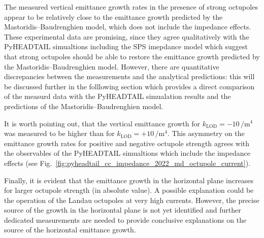 The measured vertical emittance growth rates in the presence of strong octupoles appear to be relatively close to the emittance growth predicted by the Mastoridis--Baudrenghien model, which does not include the impedance effects. These experimental data are promising, since they agree qualitatively with the PyHEADTAIL simualtions including the SPS imepdance model which suggest that strong octupoles should be able to restore the emittance growth predicted by the Mastoridis--Baudrenghien model. However, there are quantitative discrepancies between the measurements and the analytical predictions: this will be discussed further in the folllowing section which provides a direct comparison of the measurd data with the PyHEADTAIL simualation results and the predictions of the Mastoridis--Baudrenghien model.

It is worth pointing out, that the vertical emittance growth for $k_\mathrm{LOD}=-10$\,$\mathrm{/m^4}$ was measured to be higher than for $k_\mathrm{LOD}=+10$\,$\mathrm{/m^4}$. This asymmetry on the emittance growth rates for positive and negative octupole strength agrees with the observables of the PyHEADTAIL simualtions which include the impedance effects (see Fig.~\ref{fig:pyheadtail_cc_impedance_2022_md_octupole_current}).

Finally, it is evident that the emittance growth in the horizontal plane increases for larger octupole strength (in absolute value). A possible explanation could be the operation of the Landau octupoles at very high currents. However, the precise source of the growth in the horizontal plane is not yet identified and further dedicated measurements are needed to provide conclusive explanations on the source of the horizontal emittance growth. 








